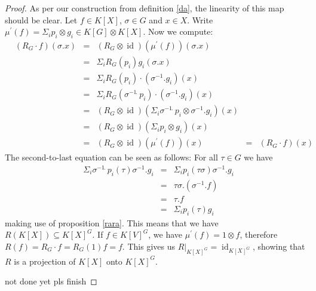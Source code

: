 \begin{proof}
  As per our construction from definition \ref{da}, the linearity of this map should be clear.
  Let $f \in K[X]$, $\sigma \in G$ and $x \in X$.
  Write $\mu^\prime (f) = \Sigma_i p_i \otimes g_i \in K[G] \otimes K[X] $.
  Now we compute:
  \begin{equation}
    \begin{aligned}
      &\left( R_G \cdot f \right) (\sigma.x)
      &=& \left( R_G \otimes \operatorname{id} \right) \left( \mu^\prime(f) \right) \left( \sigma.x \right) \\
      &&=& \Sigma_i R_G \left( p_i \right)  g_i \left( \sigma . x \right) \\
      &&=& \Sigma_i R_G (p_i) \cdot (\sigma^{-1} . g_i) (x)\\
      &&=& \Sigma_i R_G (\sigma^{-1} \dot{\phantom{.}} p_i) \cdot (\sigma^{-1}.g_i) (x)\\
      &&=&(R_G \otimes \operatorname{id}) \left( \Sigma_i \sigma^{-1} \dot{\phantom{.}} p_i \otimes \sigma^{-1}.g_i \right) (x) \\
      &&=& (R_G \otimes \operatorname{id}) \left( \Sigma_i p_i \otimes g_i \right) (x) \\
      &&=& (R_G \otimes \operatorname{id}) (\mu^\prime (f)) (x)
      &=& (R_G \cdot f) (x)
    \end{aligned}
  \end{equation}
  The second-to-last equation can be seen as follows:
  For all $\tau \in G$ we have
  \begin{equation}
    \begin{aligned}
      & \Sigma_i \sigma^{-1} \dot{\phantom{.}} p_i (\tau) \sigma^{-1} . g_i
      &=& \Sigma_i  p_i (\tau \sigma) \sigma^{-1} . g_i\\
      &&=& \tau \sigma . (\sigma^{-1} . f) \\
      &&=& \tau . f \\
      &&=& \Sigma_i p_i (\tau) g_i
    \end{aligned}
  \end{equation}
  making use of proposition \ref{rara}.
  This means that we have $R(K[X]) \subseteq K[X]^G$.
  If $f \in K[V]^G$, we have $\mu^\prime (f) = 1 \otimes f$, therefore $R(f) = R_G \cdot f = R_G (1)f = f$.
  This gives us $\left. R \right|_{K[X]^G} = \operatorname{id}_{K[X]^G}$, showing that $R$ is a projection of $K[X]$ onto $K[X]^G$.
  
  
  not done yet pls finish
\end{proof}
